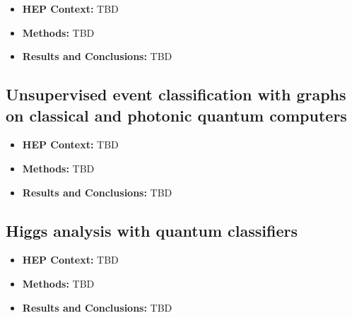 \begin{itemize}
	\item \textbf{HEP Context: }TBD
	\item \textbf{Methods: }TBD
	\item \textbf{Results and Conclusions: }TBD
\end{itemize}\subsection{Unsupervised event classification with graphs on classical and photonic quantum computers~\cite{Blance:2020ktp}}
\begin{itemize}
	\item \textbf{HEP Context: }TBD
	\item \textbf{Methods: }TBD
	\item \textbf{Results and Conclusions: }TBD
\end{itemize}\subsection{Higgs analysis with quantum classifiers~\cite{Belis:2021zqi}}
\begin{itemize}
	\item \textbf{HEP Context: }TBD
	\item \textbf{Methods: }TBD
	\item \textbf{Results and Conclusions: }TBD
\end{itemize}

